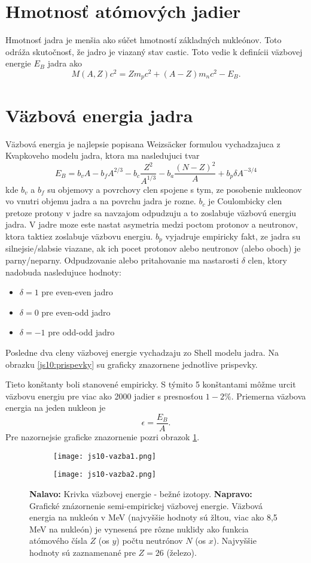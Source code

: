 \documentclass[../../main.tex]{subfiles}
\begin{document}
\section{Hmotnosť atómových jadier}
Hmotnosť jadra je menšia ako súčet hmotností základných nukleónov. Toto odráža skutočnosť, že jadro je viazaný stav castic. Toto vedie k definícii väzbovej energie $E_B$ jadra ako $$  M(A,Z)c^2=Zm_pc^2+(A-Z)m_nc^2-E_B.$$
\section{Väzbová energia jadra}
Väzbová energia je najlepsie popisana Weizsäcker formulou vychadzajuca z Kvapkoveho modelu jadra, ktora ma nasledujuci tvar
$$ E_B=b_vA-b_fA^{2/3}-b_c\frac{Z^2}{A^{1/3}}-b_a\frac{(N-Z)^2}{A}+b_p\delta A^{-3/4} $$
kde $b_v$ a $b_f$ su objemovy a povrchovy clen spojene s tym, ze posobenie nukleonov vo vnutri objemu jadra a na povrchu jadra je rozne. $b_c$ je Coulombicky clen pretoze protony v jadre sa navzajom odpudzuju a to zoslabuje väzbovú energiu jadra. V jadre moze este nastat asymetria medzi poctom protonov a neutronov, ktora taktiez zoslabuje väzbovu energiu. $b_p$ vyjadruje empiricky fakt, ze jadra su silnejsie/slabsie viazane, ak ich pocet protonov alebo neutronov (alebo oboch) je parny/neparny. Odpudzovanie alebo pritahovanie ma nastarosti $\delta$ clen, ktory nadobuda nasledujuce hodnoty:
\begin{itemize}
	\item $\delta=1$ pre even-even jadro
	\item $\delta=0$ pre even-odd jadro
	\item $\delta=-1$ pre odd-odd jadro
\end{itemize}
Posledne dva cleny väzbovej energie vychadzaju zo Shell modelu jadra. Na obrazku \ref{js10:prispevky} su graficky znazornene jednotlive prispevky.\par 
Tieto konštanty boli stanovené empiricky. S týmito 5 konštantami môžme urcit väzbovu energiu pre viac ako 2000 jadier s presnosťou $1-2\%$. Priemerna väzbova energia na jeden nukleon je $$ \epsilon=\frac{E_B}{A}.$$
Pre nazornejsie graficke znazornenie pozri obrazok \ref{js10:vazby}.
\begin{figure}[h]
\begin{subfigure}[b]{0.45\textwidth}
\centering
\texttt{[image: js10-vazba1.png]}
\end{subfigure}
\begin{subfigure}[b]{0.45\textwidth}
\centering
\texttt{[image: js10-vazba2.png]}
\end{subfigure}
\caption{\textbf{Nalavo:} Krivka väzbovej energie - bežné izotopy. \textbf{Napravo:} Grafické znázornenie semi-empirickej väzbovej energie. Väzbová energia na nukleón v MeV (najvyššie hodnoty sú žltou, viac ako 8,5 MeV na nukleón) je vynesená pre rôzne nuklidy ako funkcia atómového čísla $Z$ (os $y$) počtu neutrónov $N$ (os $x$). Najvyššie hodnoty sú zaznamenané pre $Z=26$ (železo).}
\label{js10:vazby}
\end{figure}
\end{document}
